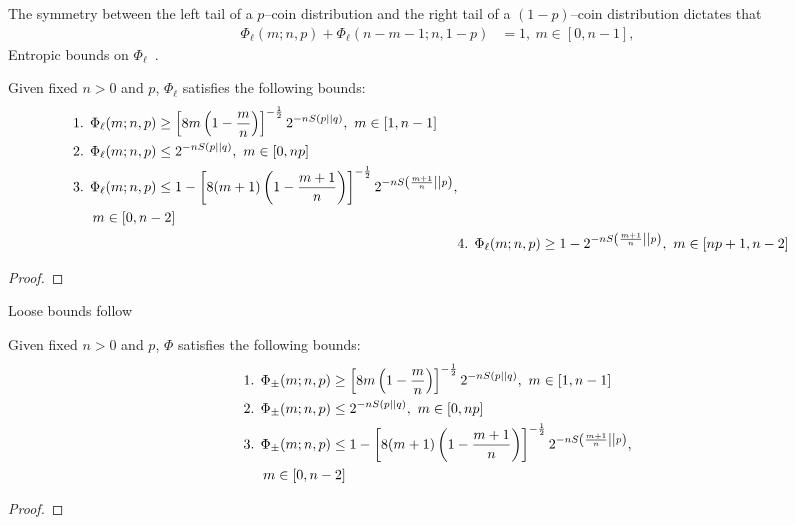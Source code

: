 \documentclass[pra,
aps,
twocolumn,
superscriptaddress,
groupedaddress,
nofootinbib,
reprint
]{revtex4-1}
\begin{document}
The symmetry between the left tail of a $p$--coin distribution and the right tail of a $(1-p)$--coin distribution dictates that
\begin{align}\label{eq:phi_reverse}
	\Phi_\ell(m; n, p) + \Phi_\ell(n-m-1; n, 1-p) &= 1,\ m\in [0,n-1],
\end{align}
Entropic bounds on $\Phi_\ell$~\cite{cit:ash}.
\begin{lemma}\label{lem:phil_bounds}
	Given fixed $n>0$ and $p$, $\Phi_\ell$ satisfies the following bounds:
	\begin{align*}
		\begin{split}
		&\text{1. } \Phi_\ell(m; n, p) \geq \left[ 8m\left(1-\frac{m}{n}\right) \right]^{-\frac{1}{2}} 2^{-n \ent{p}{q}},\ m\in [1,n-1] \\
		&\text{2. } \Phi_\ell(m; n, p) \leq 2^{-n\ent{p}{q}},\ m\in [0,np] \\
		&\text{3. } \Phi_\ell(m; n, p) \leq 1 - \left[ 8(m+1)\left(1-\frac{m+1}{n}\right) \right]^{-\frac{1}{2}} 2^{-n\ent{\frac{m+1}{n}}{p}}, \\
		&\hspace{14pt} m\in [0,n-2]
		\end{split}
		\\
		&\text{4. } \Phi_\ell(m; n, p) \geq 1 - 2^{-n\ent{\frac{m+1}{n}}{p}},\ m\in [np+1,n-2]
	\end{align*}
\end{lemma}
\begin{proof}
\end{proof}
Loose bounds follow
\begin{lemma}\label{lem:bounds_loose}
	Given fixed $n>0$ and $p$, $\Phi$ satisfies the following bounds:
	\begin{align*}
		\begin{split}
		&\text{1. } \Phi_{\pm}(m; n, p) \geq \left[ 8m\left(1-\frac{m}{n}\right) \right]^{-\frac{1}{2}} 2^{-n\ent{p}{q}},\ m\in [1,n-1] \\
		&\text{2. } \Phi_{\pm}(m; n, p) \leq 2^{-n\ent{p}{q}},\ m\in [0,np] \\
		&\text{3. } \Phi_{\pm}(m; n, p) \leq 1 - \left[ 8(m+1)\left(1-\frac{m+1}{n}\right) \right]^{-\frac{1}{2}} 2^{-n\ent{\frac{m+1}{n}}{p}}, \\
		&\hspace{14pt} m\in [0,n-2]
		\end{split}
	\end{align*}
\end{lemma}
\begin{proof}
\end{proof}
\end{document}
